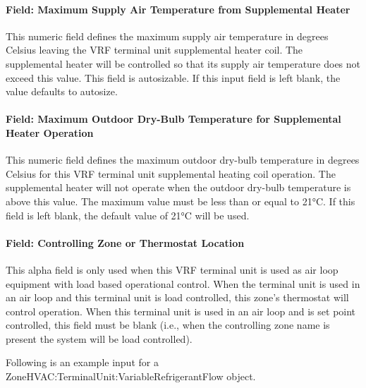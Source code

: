 \paragraph{Field: Maximum Supply Air Temperature from Supplemental Heater}\label{field-maximum-supply-air-temperature-from-supplemental-heater-2-000}

This numeric field defines the maximum supply air temperature in degrees Celsius leaving the VRF terminal unit supplemental heater coil. The supplemental heater will be controlled so that its supply air temperature does not exceed this value. This field is autosizable. If this input field is left blank, the value defaults to autosize.

\paragraph{Field: Maximum Outdoor Dry-Bulb Temperature for Supplemental Heater Operation}\label{field-maximum-outdoor-dry-bulb-temperature-for-supplemental-heater-operation-2-000}

This numeric field defines the maximum outdoor dry-bulb temperature in degrees Celsius for this VRF terminal unit supplemental heating coil operation. The supplemental heater will not operate when the outdoor dry-bulb temperature is above this value. The maximum value must be less than or equal to 21°\si{C}. If this field is left blank, the default value of 21°\si{C} will be used.

\paragraph{Field: Controlling Zone or Thermostat Location}\label{controlling-zone-or-thermostat-location-2-110}

This alpha field is only used when this VRF terminal unit is used as air loop equipment with load based operational control. When the terminal unit is used in an air loop and this terminal unit is load controlled, this zone's thermostat will control operation. When this terminal unit is used in an air loop and is set point controlled, this field must be blank (i.e., when the controlling zone name is present the system will be load controlled).

Following is an example input for a ZoneHVAC:TerminalUnit:VariableRefrigerantFlow object.


